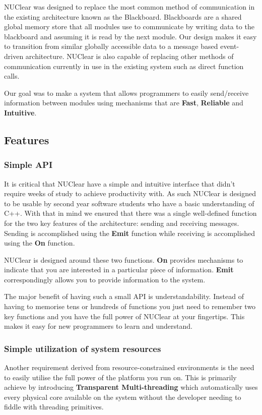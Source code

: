 \documentclass[english,12pt]{scrartcl}
\begin{document}
		NUClear was designed to replace the most common method of communication in the existing architecture known as the Blackboard.
		Blackboards are a shared global memory store that all modules use to communicate by writing data to the blackboard and assuming it is read by the next module.
		Our design makes it easy to transition from similar globally accessible data to a message based event-driven architecture.
		NUClear is also capable of replacing other methods of communication currently in use in the existing system such as direct function calls.
		
		Our goal was to make a system that allows programmers to easily send/receive information between modules using mechanisms that are \textbf{Fast}, \textbf{Reliable} and \textbf{Intuitive}.

		\subsection{Features}
			\subsubsection{Simple API}
				It is critical that NUClear have a simple and intuitive interface that didn't require weeks of study to achieve productivity with.
				As such NUClear is designed to be usable by second year software students who have a basic understanding of C++. 
				With that in mind we ensured that there was a single well-defined function for the two key features of the architecture: sending and receiving messages. Sending is accomplished using the \textbf{Emit} function while receiving is accomplished using the \textbf{On} function.
				
				NUClear is designed around these two functions. \textbf{On} provides mechanisms to indicate that you are interested in a particular piece of information.
				\textbf{Emit} correspondingly allows you to provide information to the system.
				
				The major benefit of having such a small API is understandability. 
				Instead of having to memorise tens or hundreds of functions you just need to remember two key functions and you have the full power of NUClear at your fingertips.
				This makes it easy for new programmers to learn and understand.
			
			\subsubsection{Simple utilization of system resources}
				Another requirement derived from resource-constrained environments is the need to easily utilise the full power of the platform you run on.
				This is primarily achieve by introducing \textbf{Transparent Multi-threading} which automatically uses every physical core available on the system without the developer needing to fiddle with threading primitives.
				
\end{document}
